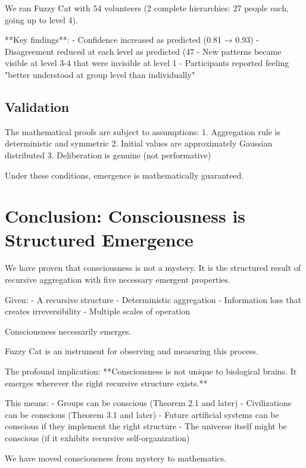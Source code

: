 \documentclass[12pt,a4paper]{article}
\theoremstyle{definition}
\begin{document}
{We ran Fuzzy Cat with 54 volunteers (2 complete hierarchies: 27 people each, going up to level 4).

**Key findings**:
- Confidence increased as predicted (0.81 → 0.93)
- Disagreement reduced at each level as predicted (47%
- New patterns became visible at level 3-4 that were invisible at level 1
- Participants reported feeling "better understood at group level than individually"

\subsection{Validation}

The mathematical proofs are subject to assumptions:
1. Aggregation rule is deterministic and symmetric
2. Initial values are approximately Gaussian distributed
3. Deliberation is genuine (not performative)

Under these conditions, emergence is mathematically guaranteed.

\section{Conclusion: Consciousness is Structured Emergence}

We have proven that consciousness is not a mystery. It is the structured result of recursive aggregation with five necessary emergent properties.

Given:
- A recursive structure
- Deterministic aggregation
- Information loss that creates irreversibility
- Multiple scales of operation

Consciousness necessarily emerges.

Fuzzy Cat is an instrument for observing and measuring this process.

The profound implication: **Consciousness is not unique to biological brains. It emerges wherever the right recursive structure exists.**

This means:
- Groups can be conscious (Theorem 2.1 and later)
- Civilizations can be conscious (Theorem 3.1 and later)
- Future artificial systems can be conscious if they implement the right structure
- The universe itself might be conscious (if it exhibits recursive self-organization)

We have moved consciousness from mystery to mathematics.


}
\end{document}
